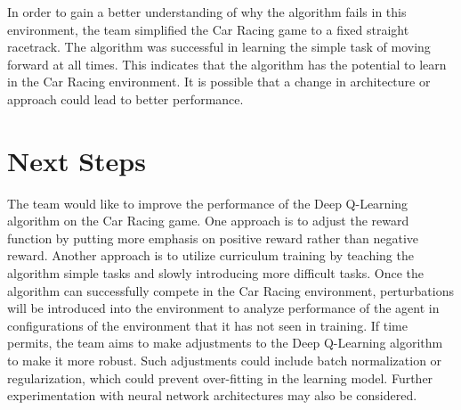 \documentclass[12pt,letterpaper]{article}
\begin{document}
In order to gain a better understanding of why the algorithm fails in this environment, the team simplified the Car Racing game to a fixed straight racetrack. The algorithm was successful in learning the simple task of moving forward at all times. This indicates that the algorithm has the potential to learn in the Car Racing environment. It is possible that a change in architecture or approach could lead to better performance.

\section{Next Steps}
The team would like to improve the performance of the Deep Q-Learning algorithm on the Car Racing game. One approach is to adjust the reward function by putting more emphasis on positive reward rather than negative reward. Another approach is to utilize curriculum training by teaching the algorithm simple tasks and slowly introducing more difficult tasks. Once the algorithm can successfully compete in the Car Racing environment, perturbations will be introduced into the environment to analyze performance of the agent in configurations of the environment that it has not seen in training. If time permits, the team aims to make adjustments to the Deep Q-Learning algorithm to make it more robust. Such adjustments could include batch normalization or regularization, which could prevent over-fitting in the learning model. Further experimentation with neural network architectures may also be considered.
\end{document}
